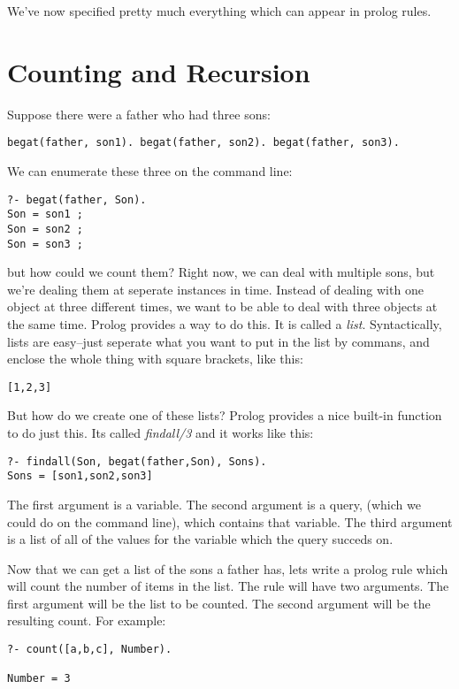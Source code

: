 \documentclass{book}[9pt]
\begin{document}
We've now specified pretty much everything which can appear in prolog
rules. 
 
\section{Counting and Recursion}

Suppose there were a father who had three sons:
\begin{verbatim}
begat(father, son1). begat(father, son2). begat(father, son3).
\end{verbatim}
\noindent We can enumerate these three on the command line:
\begin{verbatim}
?- begat(father, Son).
Son = son1 ;
Son = son2 ;
Son = son3 ;
\end{verbatim}
\noindent but how could we count them?  Right now, we can deal with
multiple sons, but we're dealing them at seperate instances in time.
Instead of dealing with one object at three different times, we want
to be able to deal with three objects at the same time.  Prolog
provides a way to do this.  It is called a {\em list}. Syntactically,
lists are easy--just seperate what you want to put in the list by
commans, and enclose the whole thing with square brackets, like this:
\begin{verbatim}
[1,2,3]
\end{verbatim}
\noindent  But how do we create one of these lists?  Prolog provides a nice
built-in function to do just this.  Its called {\em findall/3} and it works
like this:
\begin{verbatim}
?- findall(Son, begat(father,Son), Sons).
Sons = [son1,son2,son3]
\end{verbatim}

The first argument is a variable.  The second argument is a query,
(which we could do on the command line), which contains that variable.
The third argument is a list of all of the values for the variable
which the query succeds on.

Now that we can get a list of the sons a father has, lets write a
prolog rule which will count the number of items in the list.  The rule
will have two arguments.  The first argument will be the list to be counted.
The second argument will be the resulting count.  For example:

\begin{verbatim}
?- count([a,b,c], Number).

Number = 3 
\end{verbatim}
\end{document}
